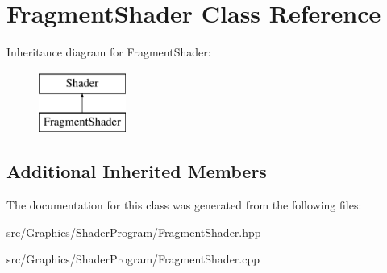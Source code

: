 \hypertarget{class_fragment_shader}{\section{Fragment\+Shader Class Reference}
\label{class_fragment_shader}
}
Inheritance diagram for Fragment\+Shader\+:\begin{figure}[H]
\begin{center}
\leavevmode
\includegraphics[height=2.000000cm]{class_fragment_shader}
\end{center}
\end{figure}
\subsection*{Additional Inherited Members}


The documentation for this class was generated from the following files\+:\begin{DoxyCompactItemize}
\item 
src/\+Graphics/\+Shader\+Program/Fragment\+Shader.\+hpp\item 
src/\+Graphics/\+Shader\+Program/Fragment\+Shader.\+cpp\end{DoxyCompactItemize}
